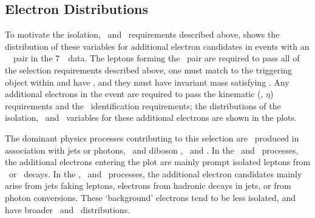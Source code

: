 \subsection{Electron Distributions}

To motivate the isolation, \dzerosig\ and \zzero\ requirements described
above,  shows the distribution of these variables for additional
electron candidates in events with an \ossf\ \dilepton\ pair in the 7~\tev\ data. 
The leptons forming the \dilepton\ pair are required to pass all of
the selection requirements described above, one must match to the triggering
object within  and have , and they must have invariant mass satisfying \sstooos. Any additional electrons in the event are required to pass
the kinematic (\pt, $\eta$) requirements and the \loosePP\ identification
requirements; the distributions of the isolation, \dzerosig\ and \zzero\
variables for these additional electrons are shown in the plots. 

The dominant
physics processes contributing to this selection are \Zll\ produced in
association with jets or photons, \ttbar\ and diboson \WW, \WZ\ and \ZZ. In the
\WZ\ and \ZZ\ processes, the additional electrons entering the plot are mainly
prompt isolated leptons from \W\ or \Z\ decays. In the \Zll, \ttbar\ and \WW\
processes, the additional electron candidates mainly 
arise from jets faking leptons, electrons from hadronic decays in jets, or from
photon conversions. These `background' electrons tend to be less isolated, and
have broader \dzerosig\ and \zzero\ distributions.

